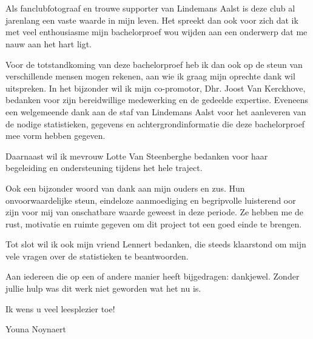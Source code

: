 
\chapter*{}%
\label{ch:voorwoord}

Als fanclubfotograaf en trouwe supporter van Lindemans Aalst is deze club al jarenlang een vaste waarde in mijn leven. Het spreekt dan ook voor zich dat ik met veel enthousiasme mijn bachelorproef wou wijden aan een onderwerp dat me nauw aan het hart ligt.

Voor de totstandkoming van deze bachelorproef heb ik dan ook op de steun van verschillende mensen mogen rekenen, aan wie ik graag mijn oprechte dank wil uitspreken. In het bijzonder wil ik mijn co-promotor, Dhr. Joost Van Kerckhove, bedanken voor zijn bereidwillige medewerking en de gedeelde expertise. Eveneens een welgemeende dank aan de staf van Lindemans Aalst voor het aanleveren van de nodige statistieken, gegevens en achtergrondinformatie die deze bachelorproef mee vorm hebben gegeven.

Daarnaast wil ik mevrouw Lotte Van Steenberghe bedanken voor haar begeleiding en ondersteuning tijdens het hele traject.

Ook een bijzonder woord van dank aan mijn ouders en zus. Hun onvoorwaardelijke steun, eindeloze aanmoediging en begripvolle luisterend oor zijn voor mij van onschatbare waarde geweest in deze periode. Ze hebben me de rust, motivatie en ruimte gegeven om dit project tot een goed einde te brengen.

Tot slot wil ik ook mijn vriend Lennert bedanken, die steeds klaarstond om mijn vele vragen over de statistieken te beantwoorden.

Aan iedereen die op een of andere manier heeft bijgedragen: dankjewel. Zonder jullie hulp was dit werk niet geworden wat het nu is.

\vspace{5mm} %

Ik wens u veel leesplezier toe!

Youna Noynaert